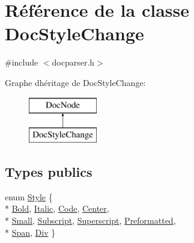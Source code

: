 \hypertarget{class_doc_style_change}{}\section{Référence de la classe Doc\+Style\+Change}
\label{class_doc_style_change}


{\ttfamily \#include $<$docparser.\+h$>$}

Graphe d\textquotesingle{}héritage de Doc\+Style\+Change\+:\begin{figure}[H]
\begin{center}
\leavevmode
\includegraphics[height=2.000000cm]{class_doc_style_change}
\end{center}
\end{figure}
\subsection*{Types publics}
\begin{DoxyCompactItemize}
\item 
enum \hyperlink{class_doc_style_change_a97757d2d85c39228c90693491a56d277}{Style} \{ \\*
\hyperlink{class_doc_style_change_a97757d2d85c39228c90693491a56d277a807d9b8b8360cb61511e5ea56237c306}{Bold}, 
\hyperlink{class_doc_style_change_a97757d2d85c39228c90693491a56d277a8c32aed981a8fef9dab678551395440d}{Italic}, 
\hyperlink{class_doc_style_change_a97757d2d85c39228c90693491a56d277ad1c85e30cf1da2bdb0de2f1fe2690aa2}{Code}, 
\hyperlink{class_doc_style_change_a97757d2d85c39228c90693491a56d277ae4330ac7dbaf5ee725a5813109f1854a}{Center}, 
\\*
\hyperlink{class_doc_style_change_a97757d2d85c39228c90693491a56d277a78ba2b4ff14390fbf298b4d232a469bc}{Small}, 
\hyperlink{class_doc_style_change_a97757d2d85c39228c90693491a56d277a5b36fd18bd9fcf1410577a6958997438}{Subscript}, 
\hyperlink{class_doc_style_change_a97757d2d85c39228c90693491a56d277a7883a437d4ca4973a9cb59231980004f}{Superscript}, 
\hyperlink{class_doc_style_change_a97757d2d85c39228c90693491a56d277a170e0ef8c35d36cb6d94c9210373a817}{Preformatted}, 
\\*
\hyperlink{class_doc_style_change_a97757d2d85c39228c90693491a56d277ab8e6f97aabed0d46a7cb62007fbb825f}{Span}, 
\hyperlink{class_doc_style_change_a97757d2d85c39228c90693491a56d277afd9182e9d7bff25af5c122b0dbc41fb1}{Div}
 \}
\end{DoxyCompactItemize}
